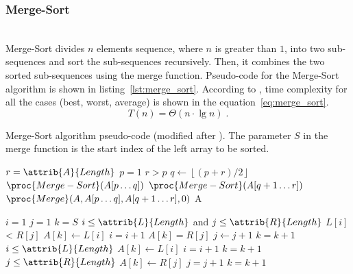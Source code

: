 \documentclass[sigconf, nonacm, natbib, screen, balance=False]{acmart}
\newcommand{\floor}[1]{\left\lfloor #1 \right\rfloor}
\begin{document}
\subsubsection{Merge-Sort}\label{sec:merge_sort}
\hfill\\
Merge-Sort divides $n$ elements sequence, where $n$ is greater than $1$, into two sub-sequences and sort the sub-sequences recursively. Then, it combines the two sorted sub-sequences using the merge function. Pseudo-code for the Merge-Sort algorithm is shown in listing~\ref{lst:merge_sort}. According to \citet[Ch.~2.3]{CLRS_2009}, time complexity for all the cases (best, worst, average) is shown in the equation~\ref{eq:merge_sort}. 
\begin{equation}
  T(n) = \Theta(n \cdot \lg n) \;.  \label{eq:merge_sort}
\end{equation}

\begin{listing}
  \caption{Merge-Sort algorithm pseudo-code (modified after \citet[Ch.~2.3]{CLRS_2009}). The parameter $S$ in the merge function is the start index of the left array to be sorted.}
  \label{lst:merge_sort}
  \begin{codebox}
  \li $r =\attrib{A}{Length}$
  \li $p = 1$
  \li \If $r > p$
  \li
  \Then
  $q \gets \floor{(p + r) / 2}$
  \li
  $\proc{Merge-Sort}(A[p \ldots q])$
  \li
  $\proc{Merge-Sort}(A[{q+1} \ldots r])$
  \li
  $\proc{Merge}(A, A[p \ldots q], A[{q+1} \ldots r], 0)$
  \End
  \li \Return A
  \end{codebox}
  \begin{codebox}
  \li $i=1$
  \li $j=1$
  \li $k=S$
  \li \While $i \leq \attrib{L}{Length}$ and $j \leq \attrib{R}{Length}$
  \li \Do
  \If $L[i]$ < $R[j]$
  \li \Then $A[k] \gets L[i]$
  \li $i=i+1$
  \li \Else $A[k]=R[j]$
  \li $j \gets j+1$
  \End
  \li $k=k+1$
  \End
  \li \While $i \leq \attrib{L}{Length}$
  \li \Do
  $A[k] \gets L[i]$
  \li $i=i+1$
  \li $k=k+1$
  \End
  \li \While $j \leq \attrib{R}{Length}$
  \li \Do
  $A[k] \gets R[j]$
  \li $j=j+1$
  \li $k=k+1$ 
  \End
  \end{codebox}
\end{listing}
\end{document}
